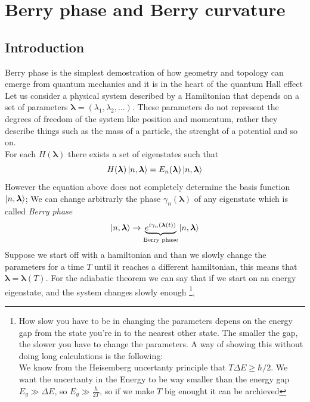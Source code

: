 \chapter{Berry phase and Berry curvature}
\section{Introduction}
    Berry phase is the simplest demostration of how geometry and topology can emerge from quantum mechanics and it is in the heart of the quantum Hall effect\newline
    Let us consider a physical system described by a Hamiltonian that depends on a set of parameters $\boldsymbol \lambda=(\lambda_1,\lambda_2,\dots)$. These parameters do not represent the degrees of freedom of the system like position and momentum, rather they describe things such as the mass of a particle, the strenght of a potential and so on.\\ For each $H(\boldsymbol \lambda)$ there exists a set of eigenstates such that 
    \begin{equation}
        H(\boldsymbol \lambda)\ket{n,\boldsymbol \lambda}=E_n(\boldsymbol \lambda)\ket{n,\boldsymbol \lambda}
    \end{equation}
    However the equation above does not completely determine the basis function $\ket{n,\boldsymbol \lambda}$; We can change arbitrarly the phase $\gamma_n(\boldsymbol \lambda)$ of any eigenstate which is called \textit{Berry phase}
    \begin{equation}
        \label{eq:berryphase}
        \ket{n,\boldsymbol \lambda}\to \underbrace{e^{i\gamma_n(\boldsymbol \lambda (t))}}_{\textrm{Berry phase}} \ket{n,\boldsymbol \lambda}  
    \end{equation}
    Suppose we start off with a hamiltonian and than we slowly change the parameters for a time $T$ until it reaches a different hamiltonian, this means that $\boldsymbol \lambda=\boldsymbol \lambda(T)$. For the adiabatic theorem we can say that if we start on an energy eigenstate, and the system changes slowly enough
    \footnote{How slow you have to be in changing the parameters depens on the energy gap from the state you're in to the nearest other state. The smaller the gap, the slower you have to change the parameters. A way of showing this without doing long calculations is the following: \\ We know from the Heisemberg uncertanty principle that $T \Delta E \ge \hbar/2$. We want the uncertanty in the Energy to be way smaller than the energy gap$E_g \gg\Delta E$, so $E_g \gg \frac{\hbar}{2T}$, so if we make $T$ big enought it can be archieved},
